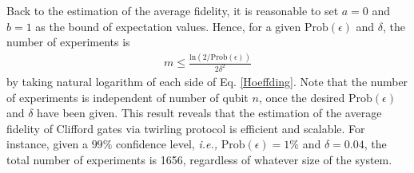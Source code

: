 \documentclass[prl,twocolumn,showpacs]{revtex4-1}
\begin{document}
Back to the estimation of the average fidelity, it is reasonable to set $a=0$ and $b=1$ as the bound of expectation values. Hence, for a given $\text{Prob}(\epsilon)$ and $\delta$, the number of experiments is
\begin{align} \label{exp_number}
m\leq \frac{\text{ln}(2/\text{Prob}(\epsilon))}{2\delta^2}
\end{align}
by taking natural logarithm of each side of Eq. \ref{Hoeffding}. Note that the number of experiments is independent of number of qubit $n$, once the desired $\text{Prob}(\epsilon)$ and $\delta$ have been given. This result reveals that the estimation of the average fidelity of Clifford gates via twirling protocol is efficient and scalable. For instance, given a $99\%$ confidence level, \emph{i.e.,} $\text{Prob}(\epsilon)=1\%$ and $\delta = 0.04$, the total number of experiments is 1656, regardless of whatever size of the system.
\end{document}
